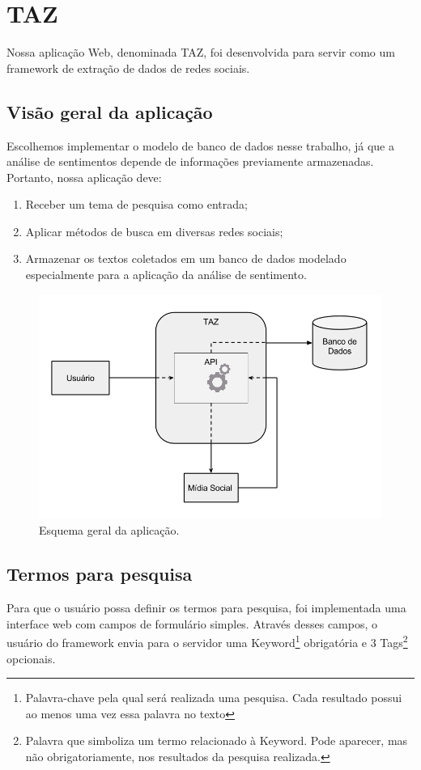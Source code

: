 \section{TAZ}
\label{sec: TAZ}
Nossa aplicação Web, denominada TAZ, foi desenvolvida para servir como um framework de extração de dados de redes sociais.

\subsection{Visão geral da aplicação}
\label{subsec: visaoGeralDaAplicacao}
Escolhemos implementar o modelo de banco de dados nesse trabalho, já que a análise de sentimentos depende de informações previamente armazenadas.
Portanto, nossa aplicação deve:
\begin{enumerate}
    \item Receber um tema de pesquisa como entrada;
    \item Aplicar métodos de busca em diversas redes sociais;
    \item Armazenar os textos coletados em um banco de dados modelado especialmente para a aplicação da análise de sentimento.
\end{enumerate}

\begin{figure}[ht]
  \centering
  \includegraphics[width=.8\textwidth]{images/esquema}
 
  \caption{Esquema geral da aplicação.}
  \label{fig:esquema}
\end{figure}

\subsection{Termos para pesquisa}
\label{subsec: TermosPesquisa}
Para que o usuário possa definir os termos para pesquisa, foi implementada uma interface web com campos de formulário simples. Através desses campos, o usuário do framework envia para o servidor uma Keyword\footnote{Palavra-chave pela qual será realizada uma pesquisa. Cada resultado possui ao menos uma vez essa palavra no texto} obrigatória e 3 Tags\footnote{Palavra que simboliza um termo relacionado à Keyword. Pode aparecer, mas não obrigatoriamente, nos resultados da pesquisa realizada.} opcionais.


